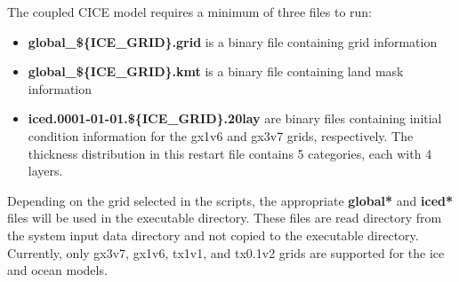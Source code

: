 
The coupled CICE model requires a minimum of three files to run:

\begin{itemize}
  \item {\bf global\_\$\{ICE\_GRID\}.grid} is a binary file containing
        grid information
  \item {\bf global\_\$\{ICE\_GRID\}.kmt} is a binary file containing
        land mask information
  \item {\bf iced.0001-01-01.\$\{ICE\_GRID\}.20lay}
         are binary files containing initial condition information 
         for the gx1v6 and gx3v7 grids, respectively. The thickness 
         distribution in this restart file contains 5 categories, each 
         with 4 layers.
\end{itemize}

Depending on the grid selected in the scripts, the appropriate {\bf global*}
and {\bf iced*} files will be used in the executable directory. These files
are read directory from the system input data directory and not copied
to the executable directory.  Currently, only gx3v7, gx1v6, tx1v1, and tx0.1v2 
grids are supported for the ice and ocean models.\\

